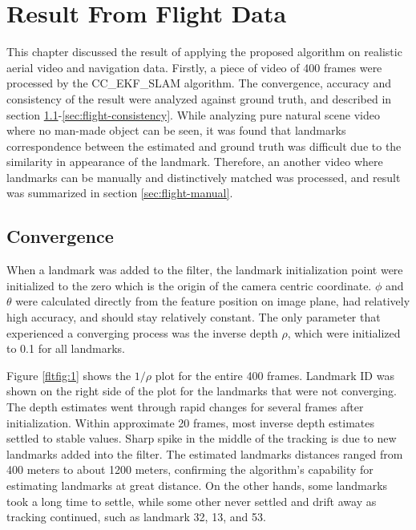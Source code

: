 \chapter{Result From Flight Data}\label{ch:FlightResult}

This chapter discussed the result of applying the proposed algorithm
on realistic aerial video and navigation data. Firstly, a piece of
video of 400 frames were processed by the CC\_EKF\_SLAM algorithm. The
convergence, accuracy and consistency of the result were analyzed
against ground truth, and described in section
\ref{sec:flight-converge}-\ref{sec:flight-consistency}. While
analyzing pure natural scene video where no man-made object can be
seen, it was found that landmarks correspondence between the
estimated and ground truth was difficult due to the
similarity in appearance of the landmark. Therefore, an another video
where landmarks can be manually and distinctively matched was
processed, and result was summarized in section \ref{sec:flight-manual}.

\section{Convergence}\label{sec:flight-converge}
When a landmark was added to the filter, the landmark initialization
point were initialized to the zero which is the origin of the camera
centric coordinate. $\phi$ and $\theta$ were calculated directly from
the feature position on image plane, had relatively high accuracy, and
should stay relatively constant. The only parameter that experienced
a converging process was the inverse depth $\rho$, which were
initialized to 0.1 for all landmarks.

Figure \ref{fltfig:1} shows the $1/\rho$ plot for the entire 400
frames. Landmark ID was shown on the right side of the plot for the
landmarks that were not converging. The depth estimates went through
rapid changes for several frames after initialization. Within
approximate 20 frames, most inverse depth estimates settled to stable
values. Sharp spike in the middle of the tracking is due to new
landmarks added into the filter. The estimated landmarks distances
ranged from 400 meters to about 1200 meters, confirming the
algorithm's capability for estimating landmarks at great distance. On
the other hands, some landmarks took a long time to settle, while some
other never settled and drift away as tracking continued, such as
landmark 32, 13, and 53. 

